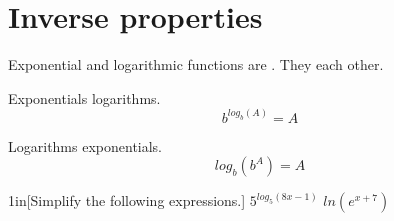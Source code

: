 \section{Inverse properties}

Exponential and logarithmic functions are .
They  each other.

\begin{tcbraster}[
    raster equal height,
    raster columns=2,
    raster left skip = 0.25in, raster right skip = 0.25in,
    raster column skip = 0.25in
]
    \begin{tcolorbox}
        Exponentials  logarithms.
        \Large
        \[
            b^{log_b(A)} = A
        \]
    \end{tcolorbox}
    \begin{tcolorbox}
        Logarithms  exponentials.
        \Large
        \[
            log_b(b^A) = A
        \]
    \end{tcolorbox}
\end{tcbraster}



\begin{my2Problems}{1in}[Simplify the following expressions.]
    {
        $5^{log_5(8x-1)}$
    }
    {
        $ln(e^{x+7})$
    }
\end{my2Problems}